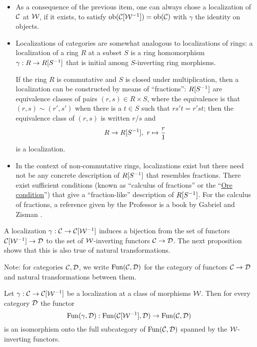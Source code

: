 \begin{itemize}
    \item As a consequence of the previous item, one can always chose a localization of $\mathcal{C}$ at $\mathcal{W}$, if it exists, to satisfy $\operatorname{ob}(\mathcal{C}[\mathcal{W}^{-1}])=\operatorname{ob}(\mathcal{C})$ with $\gamma$ the identity on objects.
    
    \item Localizations of categories are somewhat analogous to localizations of rings: a localization of a ring $R$ at a subset $S$ is a ring homomorphism $\gamma:R\to R[S^{-1}]$ that is initial among $S$-inverting ring morphisms.
    
    If the ring $R$ is commutative and $S$ is closed under multiplication, then a localization can be constructed by means of \enquote{fractions}: $R[S^{-1}]$ are equivalence classes of pairs $(r,s)\in R\times S$, where the equivalence is that $(r,s)\sim(r',s')$ when there is a $t\in S$ such that $rs't=r'st$; then the equivalence class of $(r,s)$ is written $r/s$ and
    \[R\to R[S^{-1}],\ r\mapsto \frac{r}{1}\]
    is a localization.
    
    \item In the context of non-commutative rings, localizations exist but there need not be any concrete description of $R[S^{-1}]$ that resembles fractions. There exist sufficient conditions (known as \enquote{calculus of fractions} or the \enquote{\href{https://en.wikipedia.org/wiki/Ore_condition}{Ore condition}}) that give a \enquote{fraction-like} description of $R[S^{-1}]$. For the calculus of fractions, a reference given by the Professor is a book by Gabriel and Zisman \cite{gabriel-zisman}.
\end{itemize}

A localization $\gamma:\mathcal{C}\to\mathcal{C}[\mathcal{W}^{-1}]$ induces a bijection from the set of functors $\mathcal{C}[\mathcal{W}^{-1}]\to \mathcal{D}$ to the set of $\mathcal{W}$-inverting functors $\mathcal{C}\to\mathcal{D}$. The next proposition shows that this is also true of natural transformations.

Note: for categories $\mathcal{C},\mathcal{D}$, we write $\operatorname{Fun}(\mathcal{C},\mathcal{D})$ for the category of functors $\mathcal{C}\to\mathcal{D}$ and natural transformations between them.

\begin{proposition}\label{proposition:localization-induces-embedding}
Let $\gamma:\mathcal{C}\to\mathcal{C}[\mathcal{W}^{-1}]$ be a localization at a class of morphisms $\mathcal{W}$. Then for every category $\mathcal{D}$ the functor
\[\operatorname{Fun}(\gamma,\mathcal{D}):\operatorname{Fun}(\mathcal{C}[\mathcal{W}^{-1}],\mathcal{D})\to\operatorname{Fun}(\mathcal{C},\mathcal{D})\]
is an isomorphism onto the full subcategory of $\operatorname{Fun}(\mathcal{C},\mathcal{D})$ spanned by the $\mathcal{W}$-inverting functors.
\end{proposition}

